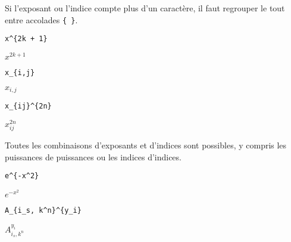 Si l'exposant ou l'indice compte plus d'un caractère, il faut
regrouper le tout entre accolades \verb={ }=.
\begin{demo}
  \begin{minipage}{0.3\linewidth}
    \begin{texample}[0.6\linewidth]
\begin{lstlisting}
x^{2k + 1}
\end{lstlisting}
      \producing\strut $x^{2k + 1}$
    \end{texample}
  \end{minipage}
  \quad
  \begin{minipage}{0.3\linewidth}
    \begin{texample}[0.6\linewidth]
\begin{lstlisting}
x_{i,j}
\end{lstlisting}
      \producing\strut $x_{i,j}$
    \end{texample}
  \end{minipage}
  \quad
  \begin{minipage}{0.3\linewidth}
    \begin{texample}[0.67\linewidth]
\begin{lstlisting}
x_{ij}^{2n}
\end{lstlisting}
      \producing\strut $x_{ij}^{2n}$
    \end{texample}
  \end{minipage}
\end{demo}

Toutes les combinaisons d'exposants et d'indices sont possibles, y
compris les puissances de puissances ou les indices d'indices.
\begin{demo}
  \begin{minipage}{0.3\linewidth}
    \begin{texample}[0.6\linewidth]
\begin{lstlisting}
e^{-x^2}
\end{lstlisting}
      \producing\strut $e^{-x^2}$
    \end{texample}
  \end{minipage}
  \quad
  \begin{minipage}{0.6\linewidth}
    \begin{texample}[0.6\linewidth]
\begin{lstlisting}
A_{i_s, k^n}^{y_i}
\end{lstlisting}
      \producing\strut $A_{i_s,k^n}^{y_i}$
    \end{texample}
  \end{minipage}
  \quad \mbox{} %
\end{demo}

